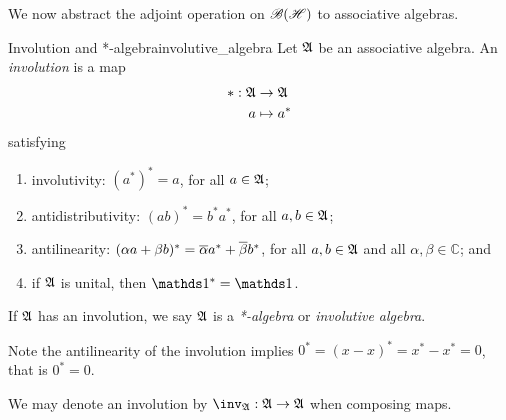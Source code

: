 We now abstract the adjoint operation on \(\mathscr{B}(\mathscr{H})\) to associative algebras.
\begin{definition}{Involution and *-algebra}{involutive_algebra}
    Let \(\mathfrak{A}\) be an associative algebra. An \emph{involution} is a map
    \begin{align*}
        * : \mathfrak{A} &\to \mathfrak{A}\\
                      a &\mapsto a^*
    \end{align*}
    satisfying
    \begin{enumerate}[label=(\alph*)]
        \item involutivity: \((a^*)^* = a\), for all \(a \in \mathfrak{A}\);
        \item antidistributivity: \((ab)^* = b^* a^*\), for all \(a, b \in \mathfrak{A}\);
        \item antilinearity: \((\alpha a + \beta b)^* = \overline{\alpha}a^* + \overline{\beta}b^*\), for all \(a,b \in \mathfrak{A}\) and all \(\alpha, \beta \in \mathbb{C}\); and
        \item if \(\mathfrak{A}\) is unital, then \(\unity^* = \unity\).
    \end{enumerate}
    If \(\mathfrak{A}\) has an involution, we say \(\mathfrak{A}\) is a \emph{*-algebra} or \emph{involutive algebra}.
\end{definition}
\begin{remark}
    Note the antilinearity of the involution implies \(0^* = (x-x)^* = x^* - x^* = 0\), that is \(0^* = 0\).
\end{remark}
\begin{remark}
    We may denote an involution by \(\inv_{\algebra{A}} : \algebra{A} \to \algebra{A}\) when composing maps.
\end{remark}

